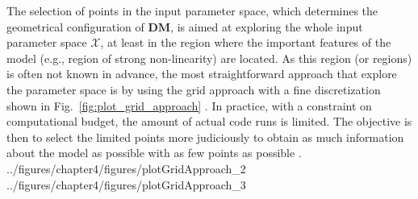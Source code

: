 The selection of points in the input parameter space, which determines the geometrical configuration of $\mathbf{DM}$, is aimed at exploring the whole input parameter space $\mathcal{X}$, at least in the region where the important features of the model (e.g., region of strong non-linearity) are located.
As this region (or regions) is often not known in advance, 
the most straightforward approach that explore the parameter space is by using the grid approach with a fine discretization shown in Fig.~\ref{fig:plot_grid_approach} \cite{Koehler1996}.
In practice, with a constraint on computational budget, the amount of actual code runs is limited.
The objective is then to select the limited points more judiciously to obtain as much information about the model as possible with as few points as possible \cite{Simpson2001a,Fang2006}.  
{../figures/chapter4/figures/plotGridApproach_2}
{../figures/chapter4/figures/plotGridApproach_3}

